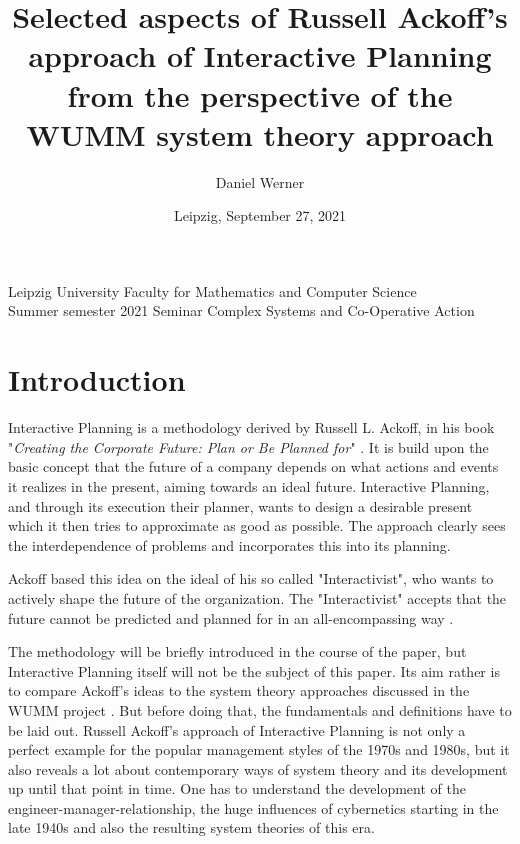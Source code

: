 \documentclass[a4paper,12pt]{article}
\title{{\LARGE Selected aspects of Russell Ackoff's approach of Interactive
    Planning from the perspective of the WUMM system theory approach}}
\author{Daniel Werner}
\date{Leipzig, September 27, 2021}
\begin{document}
\maketitle
\bigskip

\vfill

\noindent 
Leipzig University \hfill Faculty for Mathematics and Computer Science \\
Summer semester 2021 \hfill Seminar Complex Systems and Co-Operative Action \\
\thispagestyle{empty}
\clearpage

\thispagestyle{empty}
\tableofcontents
\newpage
\section{Introduction}

Interactive Planning is a methodology derived by Russell L. Ackoff, in his
book "\textit{Creating the Corporate Future: Plan or Be Planned for}"
\cite{ackoff:1981}. It is build upon the basic concept that the future of a
company depends on what actions and events it realizes in the present, aiming
towards an ideal future. Interactive Planning, and through its execution their
planner, wants to design a desirable present which it then tries to
approximate as good as possible. The approach clearly sees the interdependence
of problems and incorporates this into its planning.

Ackoff based this idea on the ideal of his so called "Interactivist", who
wants to actively shape the future of the organization. The "Interactivist"
accepts that the future cannot be predicted  and planned for in an
all-encompassing way \cite{ackoff:2001}. 

The methodology will be briefly introduced in the course of the paper, but
Interactive Planning itself will not be the subject of this paper. Its aim
rather is to compare Ackoff's ideas to the system theory approaches discussed
in the WUMM project \cite{wumm:2021}. But before doing that, the fundamentals
and definitions have to be laid out. Russell Ackoff's approach of Interactive
Planning is not only a perfect example for the popular management styles of
the 1970s and 1980s, but it also reveals a lot about contemporary ways of
system theory and its development up until that point in time. One has to
understand the development of the engineer-manager-relationship, the huge
influences of cybernetics starting in the late 1940s and also the resulting
system theories of this era.
\end{document}
